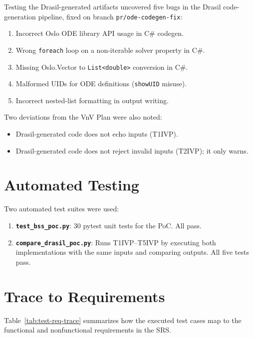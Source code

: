 \documentclass[12pt, titlepage]{article}
\begin{document}
Testing the Drasil-generated artifacts uncovered five bugs in the Drasil
code-generation pipeline, fixed on branch \texttt{pr/ode-codegen-fix}:

\begin{enumerate}
  \item Incorrect Oslo ODE library API usage in C\# codegen.
  \item Wrong \texttt{foreach} loop on a non-iterable solver property in C\#.
  \item Missing Oslo.Vector to \texttt{List<double>} conversion in C\#.
  \item Malformed UIDs for ODE definitions (\texttt{showUID} misuse).
  \item Incorrect nested-list formatting in output writing.
\end{enumerate}

Two deviations from the VnV Plan were also noted:
\begin{itemize}
  \item Drasil-generated code does not echo inputs (T1IVP).
  \item Drasil-generated code does not reject invalid inputs (T2IVP); it only
  warns.
\end{itemize}

\section{Automated Testing}

Two automated test suites were used:
\begin{enumerate}
  \item \textbf{\texttt{test\_bss\_poc.py}}: 30 pytest unit tests for the PoC.
  All pass.
  \item \textbf{\texttt{compare\_drasil\_poc.py}}: Runs T1IVP--T5IVP by
  executing both implementations with the same inputs and comparing outputs.
  All five tests pass.
\end{enumerate}

\section{Trace to Requirements}

Table~\ref{tab:test-req-trace} summarizes how the executed test cases map to
the functional and nonfunctional requirements in the SRS.
\end{document}
